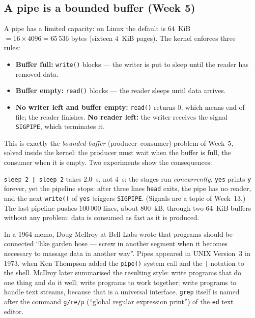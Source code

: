 \documentclass[11pt,a4paper]{article}
\newcommand{\cmd}[1]{\texttt{#1}}
\begin{document}
\subsection{A pipe is a bounded buffer (Week 5)}

A pipe has a limited capacity: on Linux the default is $64$~KiB $= 16 \times 4096 = 65\,536$ bytes (sixteen $4$~KiB pages). The kernel enforces three rules:
\begin{itemize}
  \item \textbf{Buffer full:} \cmd{write()} blocks --- the writer is put to sleep until the reader has removed data.
  \item \textbf{Buffer empty:} \cmd{read()} blocks --- the reader sleeps until data arrives.
  \item \textbf{No writer left and buffer empty:} \cmd{read()} returns $0$, which means end-of-file; the reader finishes. \textbf{No reader left:} the writer receives the signal \texttt{SIGPIPE}, which terminates it.
\end{itemize}
This is exactly the \emph{bounded-buffer} (producer--consumer) problem of Week~5, solved inside the kernel: the producer must wait when the buffer is full, the consumer when it is empty. Two experiments show the consequences:



\cmd{sleep 2 | sleep 2} takes $2.0$~s, not $4$~s: the stages run \emph{concurrently}. \cmd{yes} prints \texttt{y} forever, yet the pipeline stops: after three lines \cmd{head} exits, the pipe has no reader, and the next \cmd{write()} of \cmd{yes} triggers \texttt{SIGPIPE}. (Signals are a topic of Week~13.) The last pipeline pushes $100\,000$ lines, about $800$~kB, through two $64$~KiB buffers without any problem: data is consumed as fast as it is produced.

\begin{histnote}
In a 1964 memo, Doug McIlroy at Bell Labs wrote that programs should be connected ``like garden hose --- screw in another segment when it becomes necessary to massage data in another way''. Pipes appeared in UNIX Version~3 in 1973, when Ken Thompson added the \cmd{pipe()} system call and the \texttt{|} notation to the shell. McIlroy later summarised the resulting style: write programs that do one thing and do it well; write programs to work together; write programs to handle text streams, because that is a universal interface. \cmd{grep} itself is named after the command \texttt{g/re/p} (``global regular expression print'') of the \cmd{ed} text editor.
\end{histnote}
\end{document}
